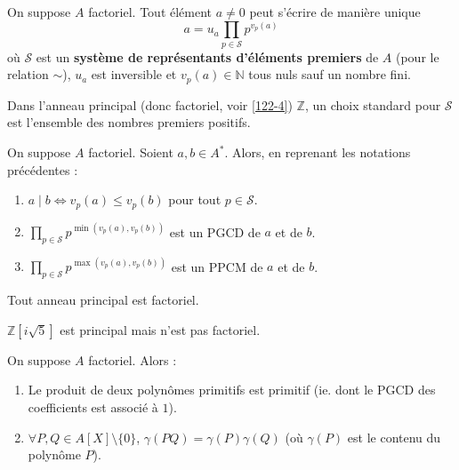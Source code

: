 
  \begin{proposition}
    On suppose $A$ factoriel. Tout élément $a \neq 0$ peut s'écrire de manière unique
    \[ a = u_a \prod_{p \in \mathcal{S}} p^{v_p(a)} \]
    où $\mathcal{S}$ est un \textbf{système de représentants d'éléments premiers} de $A$ (pour le relation $\sim$), $u_a$ est inversible et $v_p(a) \in \mathbb{N}$ tous nuls sauf un nombre fini.
  \end{proposition}

  \begin{example}
    Dans l'anneau principal (donc factoriel, voir \cref{122-4}) $\mathbb{Z}$, un choix standard pour $\mathcal{S}$ est l'ensemble des nombres premiers positifs.
  \end{example}

  \begin{proposition}
    On suppose $A$ factoriel. Soient $a, b \in A^*$. Alors, en reprenant les notations précédentes :
    \begin{enumerate}[label={\bfseries(\roman*)}]
      \item $a \mid b \iff v_p(a) \leq v_p(b)$ pour tout $p \in \mathcal{S}$.
      \item $\prod_{p \in \mathcal{S}} p^{\min(v_p(a), v_p(b))}$ est un PGCD de $a$ et de $b$.
      \item $\prod_{p \in \mathcal{S}} p^{\max(v_p(a), v_p(b))}$ est un PPCM de $a$ et de $b$.
    \end{enumerate}
  \end{proposition}

  \begin{theorem}
    \label{122-4}
    Tout anneau principal est factoriel.
  \end{theorem}

  \begin{cexample}
    $\mathbb{Z}[i\sqrt{5}]$ est principal mais n'est pas factoriel.
  \end{cexample}


  \begin{lemma}
    On suppose $A$ factoriel. Alors :
    \begin{enumerate}[label={\bfseries(\roman*)}]
      \item Le produit de deux polynômes primitifs est primitif (ie. dont le PGCD des coefficients est associé à $1$).
      \item $\forall P, Q \in A[X] \setminus \{ 0 \}$, $\gamma(PQ) = \gamma(P) \gamma(Q)$ (où $\gamma(P)$ est le contenu du polynôme $P$).
    \end{enumerate}
  \end{lemma}

